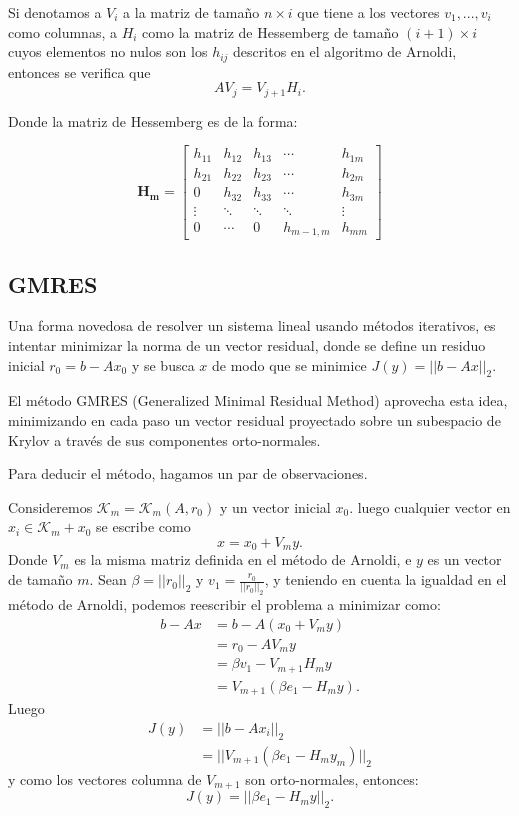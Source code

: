 \documentclass[12pt, oneside]{book}
\begin{document}
	Si denotamos a $V_i$ a la matriz de tamaño $n\times i$ que tiene a los vectores $v_1, ..., v_i$ como columnas, a $H_i$ como la matriz de Hessemberg de tamaño $(i+1)\times i$ cuyos elementos no nulos son los $h_{ij}$ descritos en el algoritmo de Arnoldi, entonces se verifica que $$AV_j=V_{j+1}H_i.$$
	
	Donde la matriz de Hessemberg es de la forma: 
	
	$$
	\mathbf{H_m} =
	\begin{bmatrix}
		h_{11} & h_{12} & h_{13} & \cdots & h_{1m} \\
		h_{21} & h_{22} & h_{23} & \cdots & h_{2m} \\
		0      & h_{32} & h_{33} & \cdots & h_{3m} \\
		\vdots & \ddots & \ddots & \ddots & \vdots \\
		0      & \cdots & 0      & h_{m-1,m} & h_{mm}
	\end{bmatrix}
	$$
	
	
\subsection{GMRES}
	Una forma novedosa de resolver un sistema lineal usando métodos iterativos, es intentar minimizar la norma de un vector residual, donde se define un residuo inicial $r_0=b-Ax_0$ y se busca $x$ de modo que se minimice $J(y)=||b-Ax||_2$.
	
	El método GMRES (Generalized Minimal Residual Method) aprovecha esta idea, minimizando en cada paso un vector residual proyectado sobre un subespacio de Krylov a través de sus componentes orto-normales. 
	
	Para deducir el método, hagamos un par de observaciones.
	
	Consideremos $\mathcal{K}_m=\mathcal{K}_{m}(A, r_0)$ y un vector inicial $x_0$. luego cualquier vector en $x_i\in\mathcal{K}_m+x_0$ se escribe como $$x=x_0+V_my.$$
	Donde $V_m$ es la misma matriz definida en el método de Arnoldi, e $y$ es un vector de tamaño $m$. Sean $\beta = ||r_0||_2$ y $v_1=\frac{r_0}{||r_0||_2}$, y teniendo en cuenta la igualdad en el método de Arnoldi, podemos reescribir el problema a minimizar como:
	\begin{equation*}
		\begin{split}
			b-Ax&=b-A(x_0+V_my)\\
			    &= r_0-AV_my\\
			&= \beta v_1-V_{m+1}H_my\\
			&= V_{m+1}(\beta e_1 - H_my).
		\end{split}
	\end{equation*}
	Luego 
	\begin{equation*}
		\begin{split}
			J(y)&=||b-Ax_i||_2\\
			&=||V_{m+1}(\beta e_1 - H_my_m)||_2    
		\end{split}
	\end{equation*}
	y como los vectores columna de $V_{m+1}$ son orto-normales, entonces:
	$$J(y)=||\beta e_1 - H_my||_2.$$
	
\end{document}
